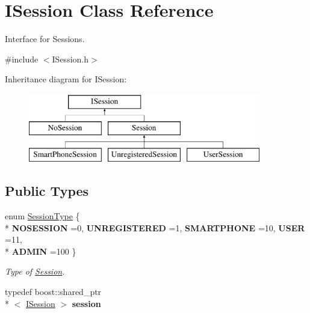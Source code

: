 \hypertarget{class_i_session}{\section{I\-Session Class Reference}
\label{class_i_session}
}


Interface for Sessions.  




{\ttfamily \#include $<$I\-Session.\-h$>$}

Inheritance diagram for I\-Session\-:\begin{figure}[H]
\begin{center}
\leavevmode
\includegraphics[height=3.000000cm]{class_i_session}
\end{center}
\end{figure}
\subsection*{Public Types}
\begin{DoxyCompactItemize}
\item 
enum \hyperlink{class_i_session_a7989a93d03d8345d213a021d7444a32f}{Session\-Type} \{ \\*
{\bfseries N\-O\-S\-E\-S\-S\-I\-O\-N} =0, 
{\bfseries U\-N\-R\-E\-G\-I\-S\-T\-E\-R\-E\-D} =1, 
{\bfseries S\-M\-A\-R\-T\-P\-H\-O\-N\-E} =10, 
{\bfseries U\-S\-E\-R} =11, 
\\*
{\bfseries A\-D\-M\-I\-N} =100
 \}
\begin{DoxyCompactList}\small\item\em Type of \hyperlink{class_session}{Session}. \end{DoxyCompactList}\item 
\hypertarget{class_i_session_aecc48c373881e5ffa036ba7b900d02d8}{typedef boost\-::shared\-\_\-ptr\\*
$<$ \hyperlink{class_i_session}{I\-Session} $>$ {\bfseries session}}\label{class_i_session_aecc48c373881e5ffa036ba7b900d02d8}

\end{DoxyCompactItemize}
